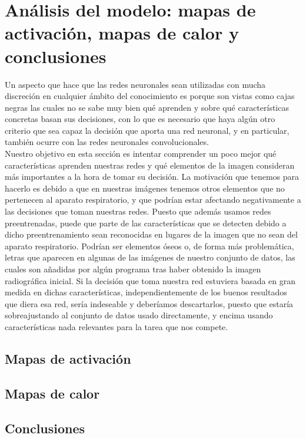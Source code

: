 \documentclass[11pt,a4paper]{article}
\theoremstyle{definition}
\begin{document}
\section{Análisis del modelo: mapas de activación, mapas de calor y conclusiones}

Un aspecto que hace que las redes neuronales sean utilizadas con mucha discreción en cualquier ámbito del conocimiento es porque son vistas como cajas negras las cuales no se sabe muy bien qué aprenden y sobre qué características concretas basan sus decisiones, con lo que es necesario que haya algún otro criterio que sea capaz la decisión que aporta una red neuronal, y en particular, también ocurre con las redes neuronales convolucionales. \\

Nuestro objetivo en esta sección es intentar comprender un poco mejor qué características aprenden nuestras redes y qué elementos de la imagen consideran más importantes a la hora de tomar su decisión.  La motivación que tenemos para hacerlo es debido a que en nuestras imágenes tenemos otros elementos que no pertenecen al aparato respiratorio, y que podrían estar afectando negativamente a las decisiones que toman nuestras redes. Puesto que además usamos redes preentrenadas, puede que parte de las características que se detecten debido a dicho preentrenamiento sean reconocidas en lugares de la imagen que no sean del aparato respiratorio. Podrían ser elementos óseos o, de forma más problemática, letras que aparecen en algunas de las imágenes de nuestro conjunto de datos, las cuales son añadidas por algún programa tras haber obtenido la imagen radiográfica inicial.  Si la decisión que toma nuestra red estuviera basada en gran medida en dichas características, independientemente de los buenos resultados que diera esa red, sería indeseable y deberíamos descartarlos, puesto que estaría sobreajustando al conjunto de datos usado directamente, y encima usando características nada relevantes para la tarea que nos compete.

\subsection{Mapas de activación}

\subsection{Mapas de calor}

\subsection{Conclusiones}
\end{document}
